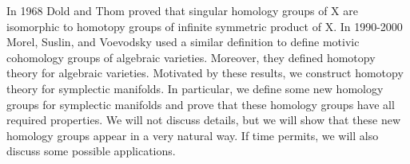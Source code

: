 \begin{partbacktext}
\begin{enumerate}
    In 1968 Dold and Thom proved that singular homology groups of X are isomorphic to homotopy groups of infinite symmetric product of X. In 1990-2000 Morel, Suslin, and Voevodsky used a similar definition to define motivic cohomology groups of algebraic varieties. Moreover, they defined homotopy theory for algebraic varieties. Motivated by these results, we construct homotopy theory for symplectic manifolds. In particular, we define some new homology groups for symplectic manifolds and prove that these homology groups have all required properties. We will not discuss details, but we will show that these new homology groups appear in a very natural way. If time permits, we will also discuss some possible applications.
\end{enumerate}

\end{partbacktext}